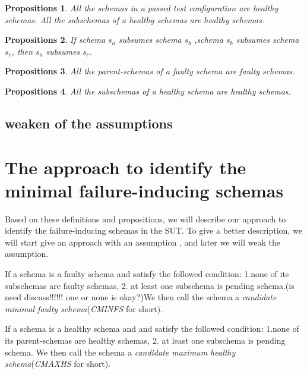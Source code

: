 \documentclass[10pt,journal,cspaper,compsoc]{IEEEtran}
\begin{document}
\begin{assumption}

\end{assumption}



\newtheorem{proposition}{Propositions}
\begin{proposition}
All the schemas in a passed test configuration are healthy schemas.
All the subschemas of a healthy schemas are healthy schemas.
\end{proposition}
\begin{proposition}
If schema $s_{a}$ subsumes  schema $s_{b}$ ,schema  $s_{b}$ subsumes schema $s_{c}$, then $s_{a}$  subsumes $s_{c}$.
\end{proposition}
\begin{proposition}
All the parent-schemas of a faulty schema are faulty schemas.
\end{proposition}
\begin{proposition}
All the subschemas of a healthy schema are healthy schemas.
\end{proposition}

\subsection{weaken of the assumptions}

\section{The approach to identify the minimal failure-inducing schemas}\label{sec:app}
Based on these definitions and propositions, we will describe our approach to identify the failure-inducing schemas in the SUT. To give a better description, we will start give an approach with an assumption , and later we will weak the assumption.

\begin{definition}
If a schema is a faulty schema and satisfy the followed condition:
1.none of its subschemas are faulty schemas, 2. at least one subschema is pending schema.(is need discuss!!!!!! one or none is okay?)We then call the schema a \emph{candidate minimal faulty schema}(\emph{CMINFS} for short).
\end{definition}
\begin{definition}
If a schema is a healthy schema and and satisfy the followed condition:
1.none of its  parent-schemas are healthy schemas, 2. at least one subschema is pending schema. We then call the schema a \emph{candidate maximum healthy schema}(\emph{CMAXHS} for short).
\end{definition}
\end{document}
